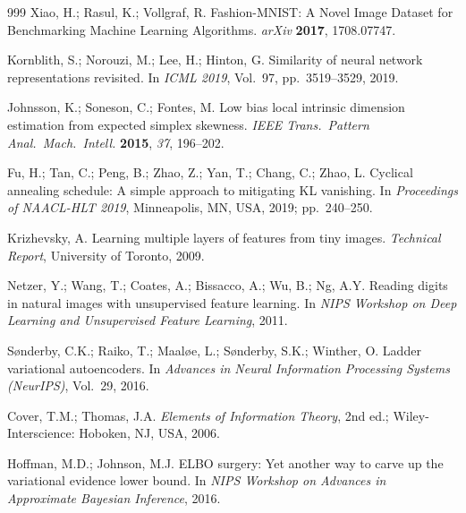 \documentclass[make,article,submit,pdftex,moreauthors]{Definitions/mdpi}
\begin{document}
\begin{thebibliography}{999}
Xiao, H.; Rasul, K.; Vollgraf, R.
Fashion-{MNIST}: A Novel Image Dataset for Benchmarking Machine Learning
Algorithms.
\textit{arXiv} \textbf{2017}, 1708.07747.

Kornblith, S.; Norouzi, M.; Lee, H.; Hinton, G.
Similarity of neural network representations revisited.
In \textit{ICML 2019}, Vol.~97, pp.~3519--3529, 2019.

Johnsson, K.; Soneson, C.; Fontes, M.
Low bias local intrinsic dimension estimation from expected simplex
skewness.
\textit{IEEE Trans.\ Pattern Anal.\ Mach.\ Intell.} \textbf{2015},
\textit{37}, 196--202.

Fu, H.; Tan, C.; Peng, B.; Zhao, Z.; Yan, T.; Chang, C.; Zhao, L.
Cyclical annealing schedule: A simple approach to mitigating {KL} vanishing.
In \textit{Proceedings of NAACL-HLT 2019}, Minneapolis, MN, USA, 2019;
pp.~240--250.

Krizhevsky, A.
Learning multiple layers of features from tiny images.
\textit{Technical Report}, University of Toronto, 2009.

Netzer, Y.; Wang, T.; Coates, A.; Bissacco, A.; Wu, B.; Ng, A.Y.
Reading digits in natural images with unsupervised feature learning.
In \textit{NIPS Workshop on Deep Learning and Unsupervised Feature Learning},
2011.

S{\o}nderby, C.K.; Raiko, T.; Maal{\o}e, L.; S{\o}nderby, S.K.; Winther, O.
Ladder variational autoencoders.
In \textit{Advances in Neural Information Processing Systems (NeurIPS)},
Vol.~29, 2016.

Cover, T.M.; Thomas, J.A.
\textit{Elements of Information Theory}, 2nd ed.;
Wiley-Interscience: Hoboken, NJ, USA, 2006.

Hoffman, M.D.; Johnson, M.J.
{ELBO} surgery: Yet another way to carve up the variational evidence lower
bound.
In \textit{NIPS Workshop on Advances in Approximate Bayesian Inference},
2016.

\end{thebibliography}
\end{document}
